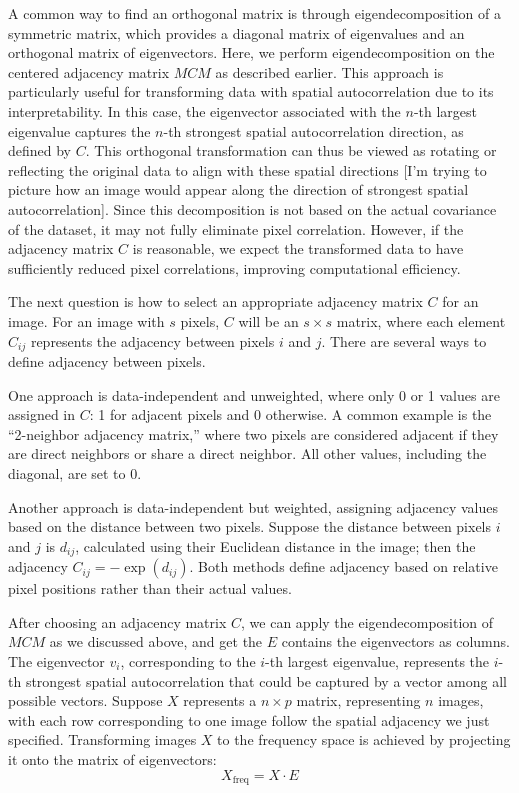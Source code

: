 \documentclass[12pt]{article}
\begin{document}
A common way to find an orthogonal matrix is through eigendecomposition of a symmetric matrix, which provides a diagonal matrix of eigenvalues and an orthogonal matrix of eigenvectors. Here, we perform eigendecomposition on the centered adjacency matrix \( M C M \) as described earlier. This approach is particularly useful for transforming data with spatial autocorrelation due to its interpretability. In this case, the eigenvector associated with the \( n \)-th largest eigenvalue captures the \( n \)-th strongest spatial autocorrelation direction, as defined by \( C \). This orthogonal transformation can thus be viewed as rotating or reflecting the original data to align with these spatial directions [I'm trying to picture how an image would appear along the direction of strongest spatial autocorrelation]. Since this decomposition is not based on the actual covariance of the dataset, it may not fully eliminate pixel correlation. However, if the adjacency matrix \( C \) is reasonable, we expect the transformed data to have sufficiently reduced pixel correlations, improving computational efficiency.

The next question is how to select an appropriate adjacency matrix \( C \) for an image. For an image with \( s \) pixels, \( C \) will be an \( s \times s \) matrix, where each element \( C_{ij} \) represents the adjacency between pixels \( i \) and \( j \). There are several ways to define adjacency between pixels. 

One approach is data-independent and unweighted, where only 0 or 1 values are assigned in \( C \): 1 for adjacent pixels and 0 otherwise. A common example is the “2-neighbor adjacency matrix,” where two pixels are considered adjacent if they are direct neighbors or share a direct neighbor. All other values, including the diagonal, are set to 0.

Another approach is data-independent but weighted, assigning adjacency values based on the distance between two pixels. Suppose the distance between pixels \( i \) and \( j \) is \( d_{ij} \), calculated using their Euclidean distance in the image; then the adjacency \( C_{ij} = - \exp(d_{ij}) \). Both methods define adjacency based on relative pixel positions rather than their actual values.

After choosing an adjacency matrix \( C \), we can apply the eigendecomposition of \( M C M \) as we discussed above, and get the \( E \) contains the eigenvectors as columns. The eigenvector \( v_i \), corresponding to the \( i \)-th largest eigenvalue, represents the \( i \)-th strongest spatial autocorrelation that could be captured by a vector among all possible vectors. Suppose \( X \) represents a \( n \times p \) matrix, representing \( n \) images, with each row corresponding to one image follow the spatial adjacency we just specified. Transforming images \( X \) to the frequency space is achieved by projecting it onto the matrix of eigenvectors:
\[
  X_{\text{freq}} = X \cdot E
\]
\end{document}
